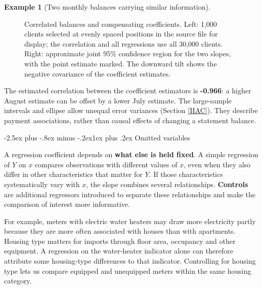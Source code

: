 \documentclass[
  11pt,
]{book}
\makeatletter
\renewcommand\subsection{\@startsection{subsection}{2}{\z@}
  {-2.5ex plus -.8ex minus -.2ex}{1ex plus .2ex}
  {\normalfont\large\bfseries\color{TextbookInk}}}
\theoremstyle{definition}
\theoremstyle{definition}
\newtheorem{example}{Example}[chapter]
\theoremstyle{definition}
\theoremstyle{definition}
\theoremstyle{remark}
\makeatother
\begin{document}
\begin{example}[Two monthly balances carrying similar information]
\begin{figure}[H]
{}

\caption{Correlated balances and compensating coefficients. Left: 1,000 clients selected at evenly spaced positions in the source file for display; the correlation and all regressions use all 30,000 clients. Right: approximate joint 95\% confidence region for the two slopes, with the point estimate marked. The downward tilt shows the negative covariance of the coefficient estimates.}\label{fig:credit-collinearity-geometry}
\end{figure}

The estimated correlation between the coefficient estimators is \textbf{-0.966}: a higher August estimate can be offset by a lower July estimate. The large-sample intervals and ellipse allow unequal error variances (Section \ref{HAC}). They describe payment associations, rather than causal effects of changing a statement balance.
\end{example}

\subsection{Omitted variables}\label{Omitted}

A regression coefficient depends on \textbf{what else is held fixed}. A simple regression of \(Y\) on \(x\) compares observations with different values of \(x\), even when they also differ in other characteristics that matter for \(Y\). If those characteristics systematically vary with \(x\), the slope combines several relationships. \textbf{Controls} are additional regressors introduced to separate these relationships and make the comparison of interest more informative.

For example, meters with electric water heaters may draw more electricity partly because they are more often associated with houses than with apartments. Housing type matters for imports through floor area, occupancy and other equipment. A regression on the water-heater indicator alone can therefore attribute some housing-type differences to that indicator. Controlling for housing type lets us compare equipped and unequipped meters within the same housing category.
\end{document}
